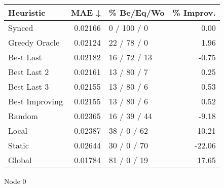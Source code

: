 \begin{tabular}{lrlr}
\toprule
\textbf{Heuristic} & \textbf{MAE ↓} & \textbf{\% Be/Eq/Wo} & \textbf{\% Improv.} \\
\midrule
            Synced &        0.02166 &          0 / 100 / 0 &                0.00 \\
     Greedy Oracle &        0.02124 &          22 / 78 / 0 &                1.96 \\
         Best Last &        0.02182 &         16 / 72 / 13 &               -0.75 \\
       Best Last 2 &        0.02161 &          13 / 80 / 7 &                0.25 \\
       Best Last 3 &        0.02155 &          13 / 80 / 6 &                0.53 \\
    Best Improving &        0.02155 &          13 / 80 / 6 &                0.52 \\
            Random &        0.02365 &         16 / 39 / 44 &               -9.18 \\
             Local &        0.02387 &          38 / 0 / 62 &              -10.21 \\
            Static &        0.02644 &          30 / 0 / 70 &              -22.06 \\
            Global &        0.01784 &          81 / 0 / 19 &               17.65 \\
\bottomrule
\end{tabular}
\caption{Node 0}
\label{tab:iid_lr05_le1_bs2_0}
